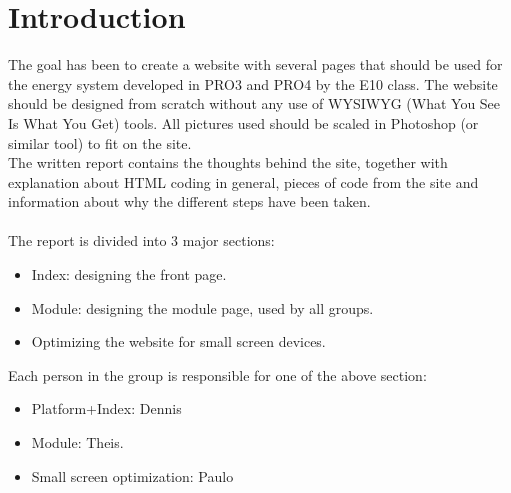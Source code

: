\chapter{Introduction}
The goal has been to create a website with several pages that should be used for the energy system developed in PRO3 and PRO4 by the E10 class. The website should be designed from scratch without any use of WYSIWYG (What You See Is What You Get) tools. All pictures used should be scaled in Photoshop (or similar tool) to fit on the site. \\The written report contains the thoughts behind the site, together with explanation about HTML coding in general, pieces of code from the site and information about why the different steps have been taken. \\
\\
The report is divided into 3 major sections:
\begin{itemize}
	\item Index: designing the front page.
	\item Module: designing the module page, used by all groups.
	\item Optimizing the website for small screen devices.
\end{itemize}
Each person in the group is responsible for one of the above section:
\begin{itemize}
	\item Platform+Index: Dennis
	\item Module: Theis.
	\item Small screen optimization: Paulo
\end{itemize}
